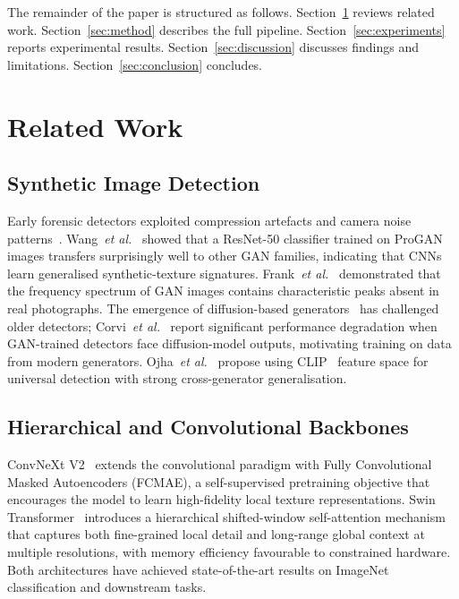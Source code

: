 \documentclass[conference]{IEEEtran}
\begin{document}
The remainder of the paper is structured as follows.  Section~\ref{sec:related}
reviews related work.  Section~\ref{sec:method} describes the full pipeline.
Section~\ref{sec:experiments} reports experimental results.
Section~\ref{sec:discussion} discusses findings and limitations.
Section~\ref{sec:conclusion} concludes.

\section{Related Work}
\label{sec:related}

\subsection{Synthetic Image Detection}

Early forensic detectors exploited compression artefacts and camera noise
patterns~\cite{farid2009image}.  Wang~\textit{et al.}~\cite{wang2020cnn} showed
that a ResNet-50 classifier trained on ProGAN images transfers surprisingly well
to other GAN families, indicating that CNNs learn generalised synthetic-texture
signatures.  Frank~\textit{et al.}~\cite{frank2020leveraging} demonstrated that
the frequency spectrum of GAN images contains characteristic peaks absent in
real photographs.  The emergence of diffusion-based generators~\cite{rombach2022latent}
has challenged older detectors; Corvi~\textit{et al.}~\cite{corvi2023detection}
report significant performance degradation when GAN-trained detectors face
diffusion-model outputs, motivating training on data from modern generators.
Ojha~\textit{et al.}~\cite{ojha2023towards} propose using CLIP~\cite{radford2021learning}
feature space for universal detection with strong cross-generator generalisation.

\subsection{Hierarchical and Convolutional Backbones}

ConvNeXt V2~\cite{woo2023convnextv2} extends the convolutional paradigm with
Fully Convolutional Masked Autoencoders (FCMAE), a self-supervised pretraining
objective that encourages the model to learn high-fidelity local texture
representations.  Swin Transformer~\cite{liu2021swin} introduces a hierarchical
shifted-window self-attention mechanism that captures both fine-grained local
detail and long-range global context at multiple resolutions, with memory
efficiency favourable to constrained hardware.  Both architectures have achieved
state-of-the-art results on ImageNet classification and downstream tasks.
\end{document}
